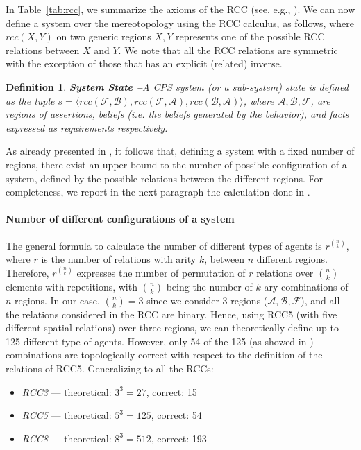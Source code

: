 \documentclass[conference]{IEEEtran}
\newcommand{\assertionRegion}{\mathcal{A}}
\newcommand{\beliefRegion}{\mathcal{B}}
\newcommand{\factRegion}{\mathcal{F}}
\newcommand{\rcc}{rcc}
\newtheorem{definition}{Definition}%
\begin{document}
In Table~\ref{tab:rcc}, we summarize the axioms of the RCC (see, e.g., \autocite{Grutter2008rcc}).  We can now define a system
over the mereotopology using the RCC calculus, as follows, where $\rcc(X,Y)$ on
two generic regions $X,Y$ represents one of the possible RCC relations between
$X$ and $Y$. We note that all the RCC relations are symmetric with the exception
of those that has an explicit (related) inverse.

\begin{definition}{\bf System State --}\label{def:opsystem}
	A CPS system (or a sub-system) state is defined as the tuple
	$s=\langle\rcc(\factRegion,\beliefRegion),\rcc(\factRegion,\assertionRegion),\rcc(\beliefRegion,\assertionRegion)\rangle$,
	where $\assertionRegion,\beliefRegion,\factRegion$, are regions of
	assertions, beliefs (i.e. the beliefs generated by the behavior), and
	facts expressed as requirements respectively.
\end{definition}

As already presented in \autocite{Santaca2016abf}, it follows that, defining
a system with a fixed number of regions, there exist
an upper-bound to the number of possible configuration of a system, defined by
the possible relations between the different regions.
For completeness, we report in the next paragraph 
the calculation done in \autocite{Santaca2016abf}.

\paragraph{Number of different configurations of a system}
The general formula to calculate the number of different types of agents is
$r^{\binom{n}{k}}$, where $r$ is the number of relations with arity $k$,
between $n$ different regions. Therefore, $r^{\binom{n}{k}}$
expresses the number of permutation of $r$
relations over ${\binom{n}{k}}$ elements with repetitions, 
with ${\binom{n}{k}}$ being the number of
$k$-ary combinations of $n$ regions.
In our case, $\binom{n}{k}=3$ since we consider $3$ regions 
($\assertionRegion,\beliefRegion,\factRegion$), and all the relations
considered in the RCC are binary.  Hence, using RCC5 (with five different
spatial relations) over three regions, we can theoretically define up to 125
different type of agents. However, only 54 of the 125 (as showed in
\autocite{improvingRCC}) combinations are topologically correct with respect to
the definition of the relations of RCC5. Generalizing to all the RCCs:

\begin{itemize}%
\item \emph{RCC3} --- theoretical: $3^3=27$,  correct: 15 
\item \emph{RCC5} --- theoretical: $5^3=125$, correct: 54
\item \emph{RCC8} --- theoretical: $8^3=512$, correct: 193
\end{itemize}
\end{document}
